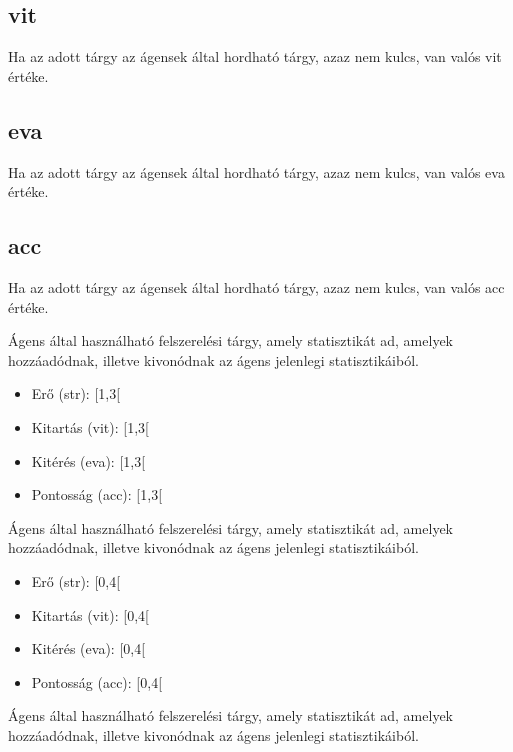 \subsection{vit}

Ha az adott tárgy az ágensek által hordható tárgy, azaz nem kulcs, van valós vit értéke.

\subsection{eva}

Ha az adott tárgy az ágensek által hordható tárgy, azaz nem kulcs, van valós eva értéke.

\subsection{acc}

Ha az adott tárgy az ágensek által hordható tárgy, azaz nem kulcs, van valós acc értéke.



Ágens által használható felszerelési tárgy, amely statisztikát ad, amelyek hozzáadódnak, illetve kivonódnak az ágens jelenlegi statisztikáiból.

\begin{itemize}
    \item Erő (str): [1,3[
    \item Kitartás (vit): [1,3[
    \item Kitérés (eva): [1,3[
    \item Pontosság (acc): [1,3[
\end{itemize}



Ágens által használható felszerelési tárgy, amely statisztikát ad, amelyek hozzáadódnak, illetve kivonódnak az ágens jelenlegi statisztikáiból.

\begin{itemize}
    \item Erő (str): [0,4[
    \item Kitartás (vit): [0,4[
    \item Kitérés (eva): [0,4[
    \item Pontosság (acc): [0,4[
\end{itemize}


Ágens által használható felszerelési tárgy, amely statisztikát ad, amelyek hozzáadódnak, illetve kivonódnak az ágens jelenlegi statisztikáiból.


